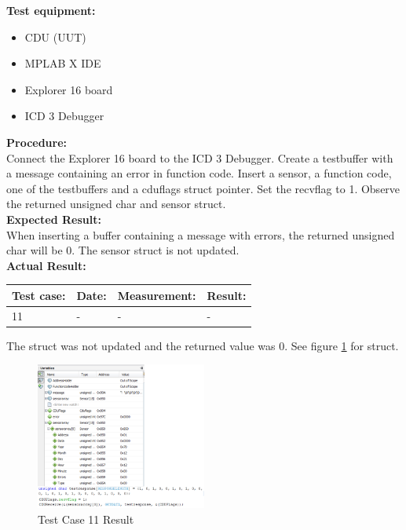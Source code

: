 \textbf{Test equipment:}
\begin{itemize}
\item CDU (UUT)
\item MPLAB X IDE
\item Explorer 16 board
\item ICD 3 Debugger
\end{itemize}

\textbf{Procedure:}\\
Connect the Explorer 16 board to the ICD 3 Debugger. Create a testbuffer with a message containing an error in function code. Insert a sensor, a function code, one of the testbuffers and a cduflags struct pointer. Set the recvflag to 1. Observe the returned unsigned char and sensor struct.\\

\textbf{Expected Result:}\\
When inserting a buffer containing a message with errors, the returned unsigned char will be 0. The sensor struct is not updated.\\

\textbf{Actual Result:}\\
\begin{table}[H]
\centering
\begin{tabular}{|p{2cm}|p{2cm}|p{3cm}|p{2cm}|}\hline
\textbf{Test case:} & \textbf{Date:} & \textbf{Measurement:} & \textbf{Result:} \\ \hline
11 & - & - & - \\ \hline
\end{tabular}
\end{table}
The struct was not updated and the returned value was 0. See figure \ref{fig:cdutestcase11} for struct.\\
\begin{figure}[H]
\centering
\includegraphics[width=0.5\textwidth]{billeder/CDUtestcase10_fail}
\caption{Test Case 11 Result}
\label{fig:cdutestcase11}
\end{figure}

